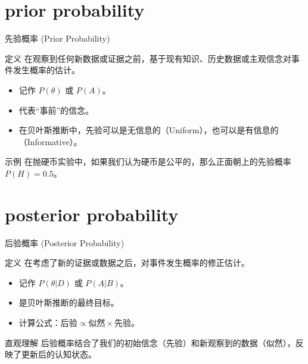 \documentclass[12pt, t, aspectratio=169]{beamer}
\begin{document}
\section{prior probability}
\begin{frame}{先验概率 (Prior Probability)}
    \begin{block}{定义}
        在观察到任何新数据或证据之前，基于现有知识、历史数据或主观信念对事件发生概率的估计。
    \end{block}
    
    \begin{itemize}
        \item 记作 $P(\theta)$ 或 $P(A)$。
        \item 代表“事前”的信念。
        \item 在贝叶斯推断中，先验可以是无信息的（Uniform），也可以是有信息的（Informative）。
    \end{itemize}
    
    \begin{exampleblock}{示例}
        在抛硬币实验中，如果我们认为硬币是公平的，那么正面朝上的先验概率 $P(H) = 0.5$。
    \end{exampleblock}
\end{frame}

\section{posterior probability}
\begin{frame}{后验概率 (Posterior Probability)}
    \begin{block}{定义}
        在考虑了新的证据或数据之后，对事件发生概率的修正估计。
    \end{block}
    
    \vspace{0.2cm}
    \begin{itemize}
        \item 记作 $P(\theta|D)$ 或 $P(A|B)$。
        \item 是贝叶斯推断的最终目标。
        \item 计算公式：$\text{后验} \propto \text{似然} \times \text{先验}$。
    \end{itemize}
    
    \vspace{0.2cm}
    \begin{alertblock}{直观理解}
        后验概率结合了我们的初始信念（先验）和新观察到的数据（似然），反映了更新后的认知状态。
    \end{alertblock}
\end{frame}
\end{document}

